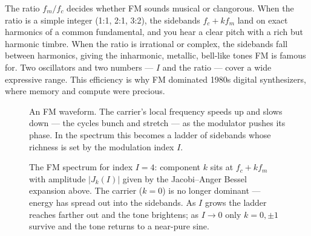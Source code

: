 \begin{aestheticbox}
The ratio $f_m/f_c$ decides whether FM sounds musical or clangorous. When the
ratio is a simple integer (1:1, 2:1, 3:2), the sidebands $f_c+k f_m$ land on
exact harmonics of a common fundamental, and you hear a clear pitch with a rich
but harmonic timbre. When the ratio is irrational or complex, the sidebands fall
between harmonics, giving the inharmonic, metallic, bell-like tones FM is famous
for. Two oscillators and two numbers --- $I$ and the ratio --- cover a wide
expressive range. This efficiency is why FM dominated 1980s digital
synthesizers, where memory and compute were precious.
\end{aestheticbox}

\begin{figure}[H]
\centering
{}
\caption{An FM waveform. The carrier's local frequency speeds up and
slows down --- the cycles bunch and stretch --- as the modulator pushes its
phase. In the spectrum this becomes a ladder of sidebands whose richness is set
by the modulation index $I$.}
\label{ch28:fig-fm}
\end{figure}

\begin{figure}[H]
\centering
{}
\caption{The FM spectrum for index $I=4$: component $k$ sits at $f_c+k f_m$ with
amplitude $|J_k(I)|$ given by the Jacobi--Anger Bessel expansion above. The carrier
($k=0$) is no longer dominant --- energy has spread out into the sidebands. As
$I$ grows the ladder reaches farther out and the tone brightens; as $I\to 0$ only
$k=0,\pm 1$ survive and the tone returns to a near-pure sine.}
\label{ch28:fig-fm-spectrum}
\end{figure}


